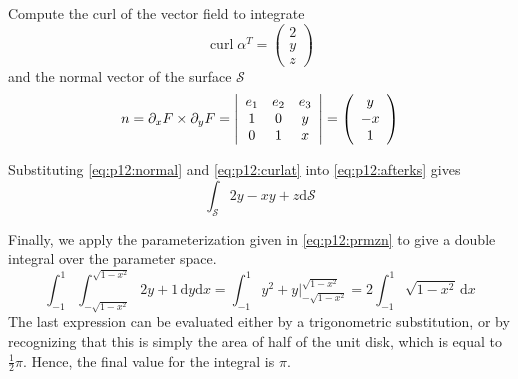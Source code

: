 \documentclass[letterpaper,11pt]{article}
\renewcommand{\d}{\mathrm{d}}
\newcommand{\parens}[1]{\left(#1\right)}
\newcommand{\abs}[1]{\left|#1\right|}
\DeclareMathOperator{\curl}{\mathrm{curl}}
\begin{document}
\begin{description}
        Compute the curl of the vector field to integrate
        \begin{equation}
            \curl{\alpha^T} = \parens{
                \begin{array}{c}
                    2\\
                    y\\
                    z
                \end{array}
            }
            \label{eq:p12:curlat}
        \end{equation}
        and the normal vector of the surface $\mathcal{S}$
        \begin{equation}
            n = \partial_x F \times \partial_y F = \abs{
                \begin{array}{c c c}
                    e_1 & e_2 & e_3 \\
                    1   & 0   & y   \\
                    0   & 1   & x
                \end{array}
            }
            = \parens{
                \begin{array}{c}
                    y \\
                    -x \\
                    1
                \end{array}
            }
            \label{eq:p12:normal}
        \end{equation}

        Substituting \eqref{eq:p12:normal} and \eqref{eq:p12:curlat} into
        \eqref{eq:p12:afterks} gives
        \begin{equation}
            \int_{\mathcal{S}} 2y - xy + z \d \mathcal{S}
            \label{eq:p12:aftersub}
        \end{equation}

        Finally, we apply the parameterization given in \eqref{eq:p12:prmzn}
        to give a double integral over the parameter space.
        \begin{equation*}
            \int_{-1}^{1} \int_{-\sqrt{1-x^2}}^{\sqrt{1-x^2}} {2y + 1}\,\d y\d x
            = \int_{-1}^{1} {y^2 + y}\bigg\rvert_{-\sqrt{1-x^2}}^{\sqrt{1-x^2}}
            = 2 \int_{-1}^{1} \sqrt{1 - x^2} \, \d x
        \end{equation*}
        The last expression can be evaluated either by a trigonometric
        substitution, or by recognizing that this is simply the area of half of
        the unit disk, which is equal to $\frac{1}{2}\pi$. Hence, the final
        value for the integral is $\pi$.
\end{description}
\end{document}
